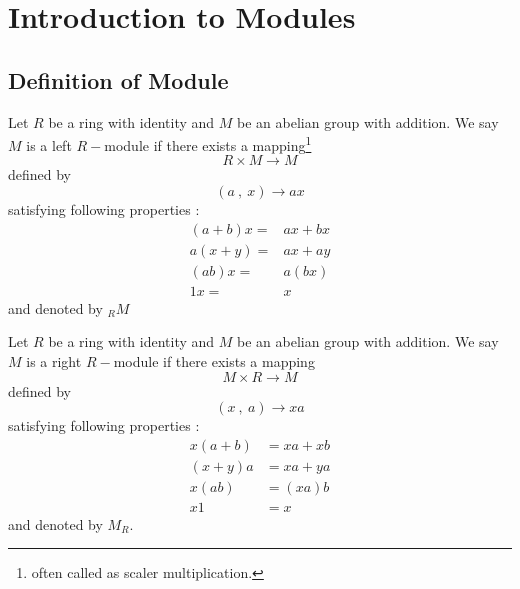\chapter{Introduction to Modules}
\section{\textbf{Definition of Module}}
\begin{defn}  
   
 Let $ R $ be a ring with identity and $ M $ be an abelian group with addition. We say $ M $ is a left $R-$module if there exists a mapping\footnote{often called as scaler multiplication.}
\begin{equation*}
R \times M \rightarrow M
\end{equation*}	
defined by
\begin{equation*}
(a \ , \ x) \rightarrow ax
\end{equation*}
satisfying following properties :
\begin{align}
(a+b) x =& ax + bx \\ a(x+y) =& ax + ay \\ (ab)x =& a(bx) \\ 1x =& x
\end{align}
and denoted by $_{R}M$
\end{defn}
\bigskip
\begin{defn}
 Let $ R $ be a ring with identity and $ M $ be an abelian group with addition. We say $ M $ is a right $R-$module if there exists a mapping
\begin{equation*}
M \times R \rightarrow M
\end{equation*}	
defined by
\begin{equation*}
(x \ ,\ a) \rightarrow xa
\end{equation*}
 satisfying following properties :
\begin{align}
x (a+b)  &= xa + xb \\ (x+y) a &= xa + ya \\ x (ab) &= (xa)b \\ x1 &= x
\end{align}
and denoted by $M_{R}$.         \end{defn}

